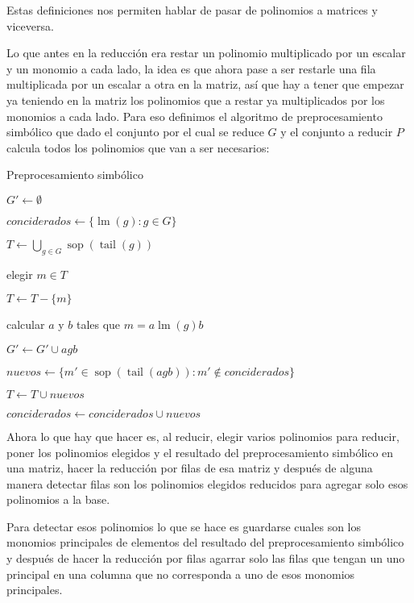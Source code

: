 \documentclass{report}
\theoremstyle{customstyle}
\theoremstyle{factstyle}
\DeclareMathOperator{\sop}{sop}
\DeclareMathOperator{\lm}{lm}
\DeclareMathOperator{\tail}{tail}
\begin{document}
Estas definiciones nos permiten hablar de pasar de polinomios a matrices y viceversa.

Lo que antes en la reducción era restar un polinomio multiplicado por un escalar y un monomio a cada lado, la idea es que ahora pase a ser restarle una fila multiplicada por un escalar a otra en la matriz, así que hay a tener que empezar ya teniendo en la matriz los polinomios que a restar ya multiplicados por los monomios a cada lado. Para eso definimos el algoritmo de preprocesamiento simbólico que dado el conjunto por el cual se reduce $G$ y el conjunto a reducir $P$ calcula todos los polinomios que van a ser necesarios:

\begin{algorithm}[H] %
  \caption{Preprocesamiento simbólico}\label{alg:Preprocesamiento simbólico}
  $G' ← ∅$

  $conciderados ← \{\lm(g) : g ∈ G\}$

  $T ← ⋃_{g ∈ G} \sop(\tail(g))$

   {
    elegir $m ∈ T$

    $T ← T - \{m\}$

     {
      \If{$\lm(g) | m$} {
        calcular $a$ y $b$ tales que $m = a \lm(g) b$

        $G' ← G' ∪ {agb}$

        $nuevos ← \{m' ∈ \sop(\tail(agb)) : m' ∉ conciderados\}$

        $T ← T ∪ nuevos$

        $conciderados ← conciderados ∪ nuevos$
      }
    }
  }

\end{algorithm}

Ahora lo que hay que hacer es, al reducir, elegir varios polinomios para reducir, poner los polinomios elegidos y el resultado del preprocesamiento simbólico en una matriz, hacer la reducción por filas de esa matriz y después de alguna manera detectar filas son los polinomios elegidos reducidos para agregar solo esos polinomios a la base.

Para detectar esos polinomios lo que se hace es guardarse cuales son los monomios principales de elementos del resultado del preprocesamiento simbólico y después de hacer la reducción por filas agarrar solo las filas que tengan un uno principal en una columna que no corresponda a uno de esos monomios principales.
\end{document}
